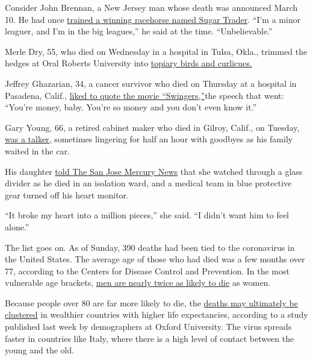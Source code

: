 Consider John Brennan, a New Jersey man whose death was announced March
10. He had once
\href{https://www.northjersey.com/story/news/2020/03/10/nj-horse-trainer-john-brennan-dies-coronavirus/5015168002/}{trained
a winning racehorse named Sugar Trader}. ``I'm a minor leaguer, and I'm
in the big leagues,'' he said at the time. ``Unbelievable.''

Merle Dry, 55, who died on Wednesday in a hospital in Tulsa, Okla.,
trimmed the hedges at Oral Roberts University into
\href{http://oruoracle.com/lifestyle/behind-the-scenery/}{topiary birds
and curlicues.}

Jeffrey Ghazarian, 34, a cancer survivor who died on Thursday at a
hospital in Pasadena, Calif.,
\href{https://www.facebookcorewwwi.onion/search/top/?q=Jeffrey\%20Ghazarian\&epa=SEARCH_BOX}{liked
to quote the movie ``Swingers,''}the speech that went: ``You're money,
baby. You're so money and you don't even know it.''

Gary Young, 66, a retired cabinet maker who died in Gilroy, Calif., on
Tuesday,
\href{https://www.mercurynews.com/2020/03/19/coronavirus-gilroy-family-forbidden-from-dying-dads-bedside-broke-my-heart-into-a-million-pieces/}{was
a talker,} sometimes lingering for half an hour with goodbyes as his
family waited in the car.

His daughter
\href{https://www.mercurynews.com/2020/03/19/coronavirus-gilroy-family-forbidden-from-dying-dads-bedside-broke-my-heart-into-a-million-pieces/}{told
The San Jose Mercury News} that she watched through a glass divider as
he died in an isolation ward, and a medical team in blue protective gear
turned off his heart monitor.

``It broke my heart into a million pieces,'' she said. ``I didn't want
him to feel alone.''

The list goes on. As of Sunday, 390 deaths had been tied to the
coronavirus in the United States. The average age of those who had died
was a few months over 77, according to the Centers for Disease Control
and Prevention. In the most vulnerable age brackets,
\href{https://www.nytimes3xbfgragh.onion/2020/02/20/health/coronavirus-men-women.html}{men
are nearly twice as likely to die} as women.

Because people over 80 are far more likely to die, the
\href{https://www.medrxiv.org/content/10.1101/2020.03.15.20036293v1}{deaths
may ultimately be clustered} in wealthier countries with higher life
expectancies, according to a study published last week by demographers
at Oxford University. The virus spreads faster in countries like Italy,
where there is a high level of contact between the young and the old.

